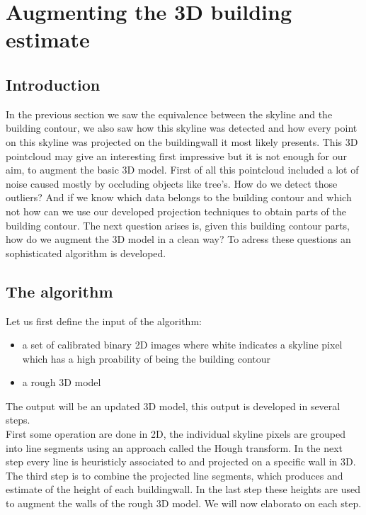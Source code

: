 
\section{Augmenting the 3D building estimate}
\subsection{Introduction}
In the previous section we saw the equivalence between the skyline and the building contour, we also saw how this skyline was detected and how every point on this skyline was projected on the buildingwall it most likely presents. 
This 3D pointcloud may give an interesting first impressive but it is not enough for our aim, to augment the basic 3D model.
First of all this pointcloud included a lot of noise caused mostly by occluding objects like tree's. How do we detect those outliers?
And if we know which data belongs to the building contour and which not how can we use our developed projection techniques to obtain parts of the building contour.
The next question arises is, given this building contour parts, how do we augment the 3D model in a clean way?
To adress these questions an sophisticated algorithm is developed.

\subsection{The algorithm}
Let us first define the input of the algorithm:
\begin{itemize}
\item a set of calibrated binary 2D images where white indicates a skyline pixel which has a high proability of being the building contour
\item a rough 3D model
\end{itemize}
The output will be an updated 3D model, this output is developed in several steps.\\
First some operation are done in 2D, the individual skyline pixels are grouped into line segments using an approach called the Hough transform. In the next step every line is heuristicly associated to and projected on a specific wall in 3D. The third step is to combine the projected line segments, which produces and estimate of the height of each buildingwall. In the last step these heights are used to augment the walls of the rough 3D model.
We will now elaborato on each step.

